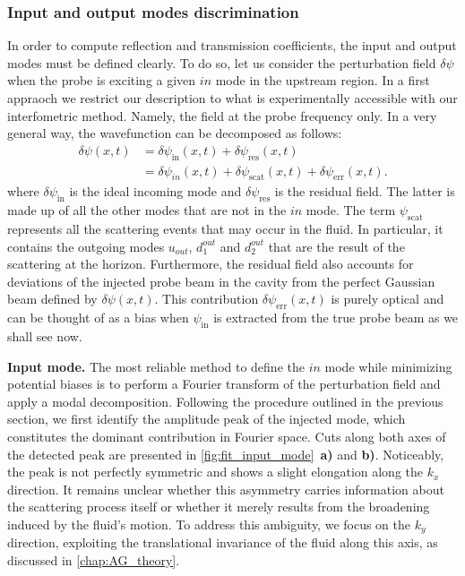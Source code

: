 \subsubsection{Input and output modes discrimination}
In order to compute reflection and transmission coefficients, the input and output modes must be defined clearly.
To do so, let us consider the perturbation field $\delta\psi$ when the probe is exciting a given $in$ mode in the upstream region. In a first appraoch we restrict our description to what is experimentally accessible with our interfometric method.
Namely, the field at the probe frequency only. In a very general way, the wavefunction can be decomposed as follows:
\begin{equation}
    \begin{aligned}
    \delta\psi(x,t) &= \delta \psi_\mathrm{in}(x,t)+\delta \psi_\mathrm{res}(x,t) \\
    &= \delta \psi_{in}(x,t) + \delta \psi_\mathrm{scat}(x,t) + \delta \psi_\mathrm{err}(x,t).
    \end{aligned}
\label{eq:scat_decomp}
\end{equation}
where $\delta \psi_\mathrm{in}$ is the ideal incoming mode and $\delta \psi_\mathrm{res}$ is the residual field. The latter is made up of all the other modes that are not in the $in$ mode. The term $\psi_\mathrm{scat}$ represents all the scattering events that may occur in the fluid. In particular, it contains the outgoing modes $u_{out}$, $d_1^{out}$ and $d_2^{out}$ that are the result of the scattering at the horizon. Furthermore, the residual field also accounts for deviations
of the injected probe beam in the cavity from the perfect Gaussian beam defined by $\delta \psi(x,t)$. This contribution $\delta \psi_\mathrm{err}(x,t)$ is purely optical and can be thought of as a bias when $\psi_\mathrm{in}$ is extracted from the true probe beam as we shall see now.

\bigskip

\textbf{Input mode.} The most reliable method to define the $in$ mode while minimizing potential biases is to perform a Fourier transform of the perturbation field and apply a modal decomposition.
 Following the procedure outlined in the previous section, we first identify the amplitude peak of the injected mode, which constitutes the dominant contribution in Fourier space. 
 Cuts along both axes of the detected peak are presented in \autoref{fig:fit_input_mode}~\textbf{a)} and \textbf{b)}.
Noticeably, the peak is not perfectly symmetric and shows a slight elongation along the \( k_x \) direction. 
It remains unclear whether this asymmetry carries information about the scattering process itself or whether it merely results from the broadening induced by the fluid's motion. 
To address this ambiguity, we focus on the \( k_y \) direction, exploiting the translational invariance of the fluid along this axis, as discussed in \autoref{chap:AG_theory}. 

